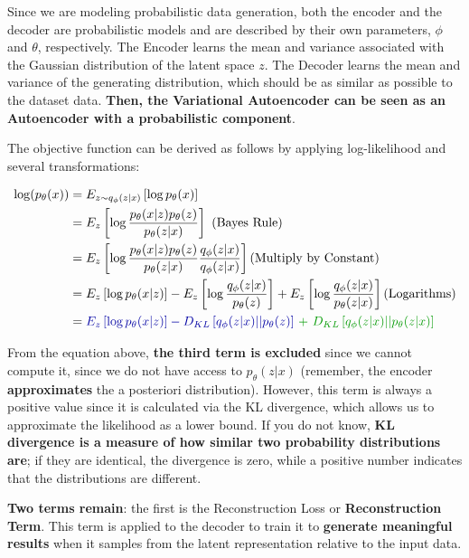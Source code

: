Since we are modeling probabilistic data generation, both the encoder and the decoder are probabilistic models and are described by their own parameters, $\phi$ and $\theta$, respectively. The Encoder learns the mean and variance associated with the Gaussian distribution of the latent space $z$. The Decoder learns the mean and variance of the generating distribution, which should be as similar as possible to the dataset data.  \textbf{Then, the Variational Autoencoder can be seen as an Autoencoder with a probabilistic component}.

The objective function can be derived as follows by applying log-likelihood and several transformations:

\begin{equation*} 
\begin{aligned}
\log (p_{\theta}(x)) &= E_{z \sim q_{\phi}(z|x)}\left[ \log p_{\theta}(x) \right]\\
&=E_{z }\left[ \log \frac{p_{\theta}(x|z) p_{\theta}(z)}{p_{\theta}(z|x)} \right]  \text{  (Bayes Rule)} \\
&=E_{z }\left[ \log \frac{p_{\theta}(x|z) p_{\theta}(z)}{p_{\theta}(z|x)} \frac{q_{\phi}(z|x) }{q_{\phi}(z|x)}\right] \text{(Multiply by Constant)} \\
&=E_{z }\left[ \log p_{\theta}(x|z) \right] - E_{z} \left[ \log \frac{q_{\phi}(z|x)}{ p_{\theta}(z)}\right] + E_{z} \left[ \log \frac{q_{\phi}(z|x)}{p_{\theta}(z|x)} \right]  \text{(Logarithms)} \\
&=\textcolor{mybluee}{E_{z }\left[ \log p_{\theta}(x|z) \right] - D_{KL} \left[ q_{\phi}(z|x)|| p_{\theta}(z)\right]}\textcolor{mygreen}{\ + \ D_{KL} \left[ q_{\phi}(z|x)||p_{\theta}(z|x) \right]} 
\end{aligned}
\end{equation*}

From the equation above, \textbf{\textcolor{mygreen}{the third term is excluded}} since we cannot compute it, since we do not have access to $p_{\theta}(z|x)$ (remember, the encoder \textbf{approximates} the a posteriori distribution). However, this term is always a positive value since it is calculated via the KL divergence, which allows us to approximate the likelihood as a lower bound. If you do not know, \textbf{KL divergence is a measure of how similar two probability distributions are}; if they are identical, the divergence is zero, while a positive number indicates that the distributions are different.

\textbf{\textcolor{mybluee}{Two terms remain}}: the first is the Reconstruction Loss or \textbf{\textcolor{mybluee}{Reconstruction Term}}. This term is applied to the decoder to train it to \textbf{generate meaningful results} when it samples from the latent representation relative to the input data.

